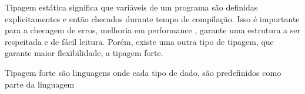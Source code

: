 \documentclass[12pt]{article}
\begin{document}
        Tipagem estática significa que variáveis de um programa são definidas explicitamentes e então 
        checados durante tempo de compilação. Isso é importante para a checagem de erros, melhoria em performance , garante 
        uma estrutura a ser respeitada e de fácil leitura. Porém, existe uma outra tipo de tipagem, que garante maior 
        flexibilidade, a tipagem forte. 

        Tipagem forte são linguagens onde cada tipo de dado, são predefinidos como parte da linguagem
\end{document}

